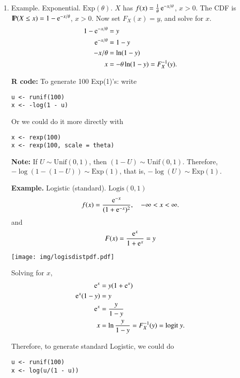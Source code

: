 \documentclass[11pt,english]{scrbook}
\begin{document}
\begin{enumerate}
\item Example. Exponential. \(\mathrm{Exp}(\theta)\).
\label{sec:orgc74395a}
\(X\) has \(f(x)=\frac{1}{\theta}\, \mathrm{e}^{-x/\theta}\), \(x > 0\).  The CDF is \(\mathrm{I\hspace{-1.5pt}P}(X\leq x)=1 - \mathrm{e}^{-x/\theta}\), \(x > 0\). Now set \(F_{X}(x) = y\), and solve for \(x\). 
\begin{align*}
1 - \mathrm{e}^{-x/\theta} & = y\\
\mathrm{e}^{-x/\theta} & = 1 - y\\
-x/\theta & = \ln(1-y)\\
x & = -\theta\ln(1-y) = F_{X}^{-1}(y).
\end{align*}

\textbf{R code:} To generate 100 Exp(1)'s: write
\begin{verbatim}
u <- runif(100)
x <- -log(1 - u)
\end{verbatim}

Or we could do it more directly with
\begin{verbatim}
x <- rexp(100)
x <- rexp(100, scale = theta)
\end{verbatim}


\textbf{Note:} If \(U\sim \mathrm{Unif}(0,1)\), then \((1-U)\sim \mathrm{Unif}(0,1)\). Therefore, \(-\log(1-(1-U))\sim \mathrm{Exp}(1)\), that is, \(-\log(U)\sim \mathrm{Exp}(1)\).

\textbf{Example.} Logistic (standard). \(\mathrm{Logis}(0,1)\)
\[
f(x)=\frac{\mathrm{e}^{-x}}{(1 + \mathrm{e}^{-x})^{2}},\quad -\infty < x <\infty.
\]
and 
\[
F(x)=\frac{\mathrm{e}^{x}}{1 + \mathrm{e}^{x}} = y
\]
\begin{center}
\begin{center}
\texttt{[image: img/logisdistpdf.pdf]}
\end{center}

\end{center}
Solving for \(x\), 
\begin{align*}
\mathrm{e}^{x} & = y(1 + \mathrm{e}^{x})\\
\mathrm{e}^{x}(1-y) & = y\\
\mathrm{e}^{x} & = \frac{y}{1 - y} \\
x & = \ln \frac{y}{1 - y} = F_{X}^{-1}(y) = \mbox{logit}\ y.
\end{align*}

Therefore, to generate standard Logistic, we could do
\begin{verbatim}
u <- runif(100)
x <- log(u/(1 - u))
\end{verbatim}


\end{enumerate}
\end{document}
